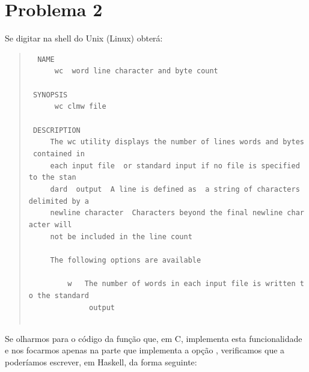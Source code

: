 \documentclass[a4paper]{article}
\newcommand{\Varid}[1]{\mathit{#1}}
\begin{document}
\section*{Problema 2}
Se digitar \wc{\ensuremath{\Varid{man}\;\Varid{wc}}} na shell do Unix (Linux) obterá:
\begin{quote}\small
\begin{tabbing}\tt
~NAME\\
\tt ~~~~~~wc~~word~line~character~and~byte~count\\
\tt ~\\
\tt ~SYNOPSIS\\
\tt ~~~~~~wc~clmw~file~\\
\tt ~\\
\tt ~DESCRIPTION\\
\tt ~~~~~The~wc~utility~displays~the~number~of~lines~words~and~bytes~contained~in\\
\tt ~~~~~each~input~file~~or~standard~input~if~no~file~is~specified~to~the~stan\\
\tt ~~~~~dard~~output~~A~line~is~defined~as~~a~string~of~characters~delimited~by~a\\
\tt ~~~~~newline~character~~Characters~beyond~the~final~newline~character~will\\
\tt ~~~~~not~be~included~in~the~line~count\\
\tt ~~~~~\\
\tt ~~~~~The~following~options~are~available\\
\tt ~~~~~\\
\tt ~~~~~~~~~w~~~The~number~of~words~in~each~input~file~is~written~to~the~standard~\\
\tt ~~~~~~~~~~~~~~output\\
\tt ~~~~~
\end{tabbing}
\end{quote}
Se olharmos para o código da função que, em C, implementa esta funcionalidade
\cite{KR78} e nos focarmos apenas na parte que implementa a opção ,
verificamos que a poderíamos escrever, em Haskell, da forma seguinte:
\end{document}
